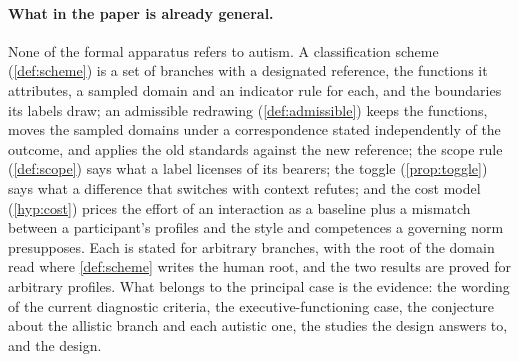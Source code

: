 
\paragraph{What in the paper is already general.} None of the formal apparatus refers to autism. A classification scheme (\autoref{def:scheme}) is a set of branches with a designated reference, the functions it attributes, a sampled domain and an indicator rule for each, and the boundaries its labels draw; an admissible redrawing (\autoref{def:admissible}) keeps the functions, moves the sampled domains under a correspondence stated independently of the outcome, and applies the old standards against the new reference; the scope rule (\autoref{def:scope}) says what a label licenses of its bearers; the toggle (\autoref{prop:toggle}) says what a difference that switches with context refutes; and the cost model (\autoref{hyp:cost}) prices the effort of an interaction as a baseline plus a mismatch between a participant's profiles and the style and competences a governing norm presupposes. Each is stated for arbitrary branches, with the root of the domain read where \autoref{def:scheme} writes the human root, and the two results are proved for arbitrary profiles. What belongs to the principal case is the evidence: the wording of the current diagnostic criteria, the executive-functioning case, the conjecture about the allistic branch and each autistic one, the studies the design answers to, and the design.

